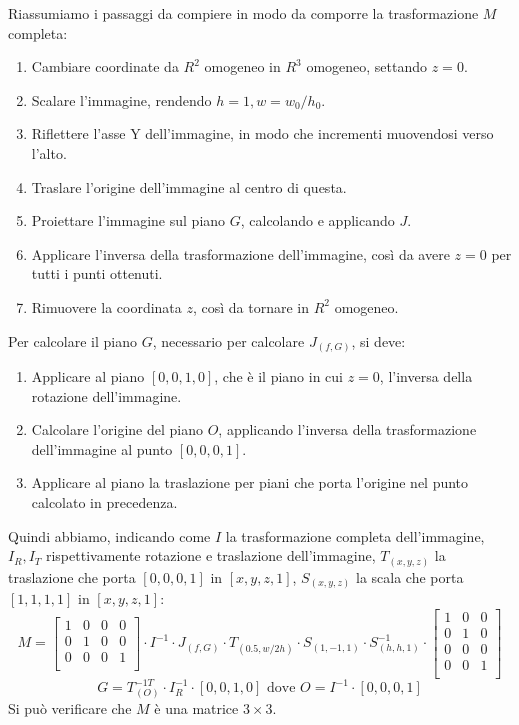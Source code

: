 Riassumiamo i passaggi da compiere in modo da comporre la trasformazione $M$ completa:
\begin{enumerate}
    \item Cambiare coordinate da $R^2$ omogeneo in $R^3$ omogeneo, settando $z=0$.
    \item Scalare l'immagine, rendendo $h = 1, w = w_0/h_0$.
    \item Riflettere l'asse Y dell'immagine, in modo che incrementi muovendosi verso l'alto.
    \item Traslare l'origine dell'immagine al centro di questa.
    \item Proiettare l'immagine sul piano $G$, calcolando e applicando $J$.
    \item Applicare l'inversa della trasformazione dell'immagine, così da avere $z=0$ per tutti i punti ottenuti.
    \item Rimuovere la coordinata $z$, così da tornare in $R^2$ omogeneo.
\end{enumerate}
Per calcolare il piano $G$, necessario per calcolare $J_{(f, G)}$, si deve:
\begin{enumerate}
    \item Applicare al piano $[0, 0, 1, 0]$, che è il piano in cui $z=0$, l'inversa della rotazione dell'immagine.
    \item Calcolare l'origine del piano $O$, applicando l'inversa della trasformazione dell'immagine al punto $[0, 0, 0, 1]$.
    \item Applicare al piano la traslazione per piani che porta l'origine nel punto calcolato in precedenza.
\end{enumerate}
Quindi abbiamo, indicando come $I$ la trasformazione completa dell'immagine, $I_R, I_T$ rispettivamente rotazione e traslazione dell'immagine, $T_{(x, y, z)}$ la traslazione che porta $[0, 0, 0, 1]$ in $[x, y, z, 1]$, $S_{(x, y, z)}$ la scala che porta $[1, 1, 1, 1]$ in $[x, y, z, 1]$:
\begin{equation}
    M =
    \begin{bmatrix}
        1 & 0 & 0 & 0 \\
        0 & 1 & 0 & 0 \\
        0 & 0 & 0 & 1 \\
    \end{bmatrix}
    \cdot I^{-1} \cdot J_{(f, G)} \cdot T_{(0.5, w/2h)} \cdot S_{(1, -1, 1)} \cdot S_{(h, h, 1)}^{-1} \cdot
    \begin{bmatrix}
        1 & 0 & 0 \\
        0 & 1 & 0 \\
        0 & 0 & 0 \\
        0 & 0 & 1 \\
    \end{bmatrix}
\end{equation}
\begin{equation}
    G = T_{(O)}^{-1T} \cdot I_R^{-1} \cdot [0, 0, 1, 0]
    \text{ dove }
    O = I^{-1} \cdot [0, 0, 0, 1]
\end{equation}
Si può verificare che $M$ è una matrice $3 \times 3$.
